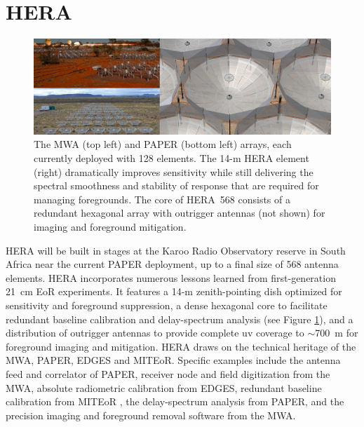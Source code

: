 \documentclass[preprint]{aastex}
\begin{document}
\vspace{-0.25in}
\section{HERA}
\label{PDsec}
\begin{figure}[t]\centering
\includegraphics[width=6.5in]{plots/PAPER_and_MWA_and_HERA.jpg}
\caption{\small
The MWA (top left) and PAPER (bottom left) arrays, each currently deployed with 128 elements.
The 14-m HERA element (right) dramatically improves sensitivity
while still delivering the spectral smoothness and stability of response that
are required for managing foregrounds.
The core of HERA~568 consists of a redundant hexagonal array with
outrigger antennas (not shown) for imaging and foreground mitigation.
}
\label{HERAfig}
\end{figure}

HERA will be built in stages at the Karoo Radio Observatory reserve in South Africa near the
current PAPER deployment, up to a final size of 568 antenna elements.
HERA 
incorporates numerous lessons learned from first-generation 21~cm EoR experiments.
It features a 14-m zenith-pointing dish optimized for sensitivity and foreground suppression,
a dense hexagonal core to facilitate redundant baseline calibration and
delay-spectrum analysis (see Figure \ref{HERAfig}), and a distribution of outrigger antennas to provide
complete uv coverage to $\sim$700~m for foreground imaging and mitigation.
HERA draws on the technical heritage of the MWA, PAPER,
EDGES and MITEoR. Specific examples include the antenna feed and correlator of
PAPER, receiver node and field digitization from the MWA, absolute radiometric
calibration from EDGES, redundant baseline calibration from MITEoR \citep{zheng_et_al2013_trunc}, the
delay-spectrum analysis from PAPER, and the precision imaging and foreground
removal software from the MWA.

\end{document}

